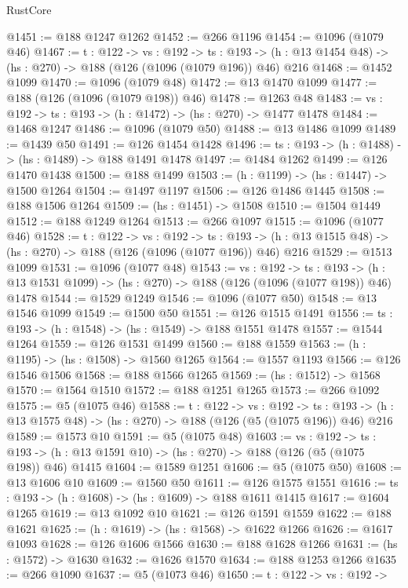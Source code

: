 \begin{lexlean}{RustCore}
\begin{coremodule}
@1451 := @188 @1247 @1262
@1452 := @266 @1196
@1454 := @1096 (@1079 @46)
@1467 := {t : @122} ->
  {vs : @192} ->
  {ts : @193} -> (h : @13 @1454 @48) -> (hs : @270) -> @188 (@126 (@1096 (@1079 @196)) @46) @216
@1468 := @1452 @1099
@1470 := @1096 (@1079 @48)
@1472 := @13 @1470 @1099
@1477 := @188 (@126 (@1096 (@1079 @198)) @46)
@1478 := @1263 @48
@1483 := {vs : @192} -> {ts : @193} -> (h : @1472) -> (hs : @270) -> @1477 @1478
@1484 := @1468 @1247
@1486 := @1096 (@1079 @50)
@1488 := @13 @1486 @1099
@1489 := @1439 @50
@1491 := @126 @1454 @1428
@1496 := {ts : @193} -> (h : @1488) -> (hs : @1489) -> @188 @1491 @1478
@1497 := @1484 @1262
@1499 := @126 @1470 @1438
@1500 := @188 @1499
@1503 := (h : @1199) -> (hs : @1447) -> @1500 @1264
@1504 := @1497 @1197
@1506 := @126 @1486 @1445
@1508 := @188 @1506 @1264
@1509 := (hs : @1451) -> @1508
@1510 := @1504 @1449
@1512 := @188 @1249 @1264
@1513 := @266 @1097
@1515 := @1096 (@1077 @46)
@1528 := {t : @122} ->
  {vs : @192} ->
  {ts : @193} -> (h : @13 @1515 @48) -> (hs : @270) -> @188 (@126 (@1096 (@1077 @196)) @46) @216
@1529 := @1513 @1099
@1531 := @1096 (@1077 @48)
@1543 := {vs : @192} ->
  {ts : @193} -> (h : @13 @1531 @1099) -> (hs : @270) -> @188 (@126 (@1096 (@1077 @198)) @46) @1478
@1544 := @1529 @1249
@1546 := @1096 (@1077 @50)
@1548 := @13 @1546 @1099
@1549 := @1500 @50
@1551 := @126 @1515 @1491
@1556 := {ts : @193} -> (h : @1548) -> (hs : @1549) -> @188 @1551 @1478
@1557 := @1544 @1264
@1559 := @126 @1531 @1499
@1560 := @188 @1559
@1563 := (h : @1195) -> (hs : @1508) -> @1560 @1265
@1564 := @1557 @1193
@1566 := @126 @1546 @1506
@1568 := @188 @1566 @1265
@1569 := (hs : @1512) -> @1568
@1570 := @1564 @1510
@1572 := @188 @1251 @1265
@1573 := @266 @1092
@1575 := @5 (@1075 @46)
@1588 := {t : @122} ->
  {vs : @192} ->
  {ts : @193} -> (h : @13 @1575 @48) -> (hs : @270) -> @188 (@126 (@5 (@1075 @196)) @46) @216
@1589 := @1573 @10
@1591 := @5 (@1075 @48)
@1603 := {vs : @192} ->
  {ts : @193} -> (h : @13 @1591 @10) -> (hs : @270) -> @188 (@126 (@5 (@1075 @198)) @46) @1415
@1604 := @1589 @1251
@1606 := @5 (@1075 @50)
@1608 := @13 @1606 @10
@1609 := @1560 @50
@1611 := @126 @1575 @1551
@1616 := {ts : @193} -> (h : @1608) -> (hs : @1609) -> @188 @1611 @1415
@1617 := @1604 @1265
@1619 := @13 @1092 @10
@1621 := @126 @1591 @1559
@1622 := @188 @1621
@1625 := (h : @1619) -> (hs : @1568) -> @1622 @1266
@1626 := @1617 @1093
@1628 := @126 @1606 @1566
@1630 := @188 @1628 @1266
@1631 := (hs : @1572) -> @1630
@1632 := @1626 @1570
@1634 := @188 @1253 @1266
@1635 := @266 @1090
@1637 := @5 (@1073 @46)
@1650 := {t : @122} ->
  {vs : @192} ->

\end{coremodule}
\end{lexlean}
